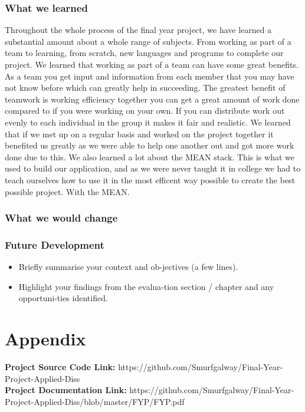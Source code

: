 \subsection{What we learned}
Throughout the whole process of the final year project, we have learned a substantial amount about a whole range of subjects. From working as part of a team to learning, from scratch, new languages and programs to complete our project. We learned that working as part of a team can have some great benefits. As a team you get input and information from each member that you may have not know before which can greatly help in succeeding. The greatest benefit of teamwork is working efficiency together you can get a great amount of work done compared to if you were working on your own. If you can distribute work out evenly to each individual in the group it makes it fair and realistic. We learned that if we met up on a regular basis and worked on the project together it benefited us greatly as we were able to help one another out and got more work done due to this. We also learned a lot about the MEAN stack. This is what we used to build our application, and as we were never taught it in college we had to teach ourselves how to use it in the most efficent way possible to create the best possible project. With the MEAN.

\subsection{What we would change}

\subsection{Future Development}

\begin{itemize}
\item Briefly summarise your context and ob-jectives (a few lines).
\item Highlight your findings from the evalua-tion section / chapter and any opportuni-ties identified.
\end{itemize}

\chapter{Appendix}
\textbf{Project Source Code Link: } https://github.com/Smurfgalway/Final-Year-Project-Applied-Diss \\
\textbf{Project Documentation Link: } https://github.com/Smurfgalway/Final-Year-Project-Applied-Diss/blob/master/FYP/FYP.pdf\\